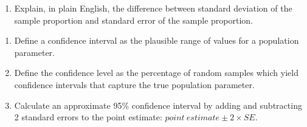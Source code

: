 \documentclass[11pt]{article}
\begin{document}
{{\begin{itemize}
{\begin{enumerate}
\item Explain, in plain English, the difference between standard deviation of the sample proportion and standard error of the sample proportion.
\end{enumerate}
}
\end{itemize}
}}


%

\vspace{0.5cm}

%

\begin{enumerate}[resume]
\renewcommand\labelenumi{\textcolor{light}{\textbf{LO \theenumi.}}}

\item Define a confidence interval as the plausible range of values for a population parameter.

\item Define the confidence level as the percentage of random samples which yield confidence intervals that capture the true population parameter.

\item Calculate an approximate 95\% confidence interval by adding and subtracting 2 standard errors to the point estimate: $point~estimate \pm 2 \times SE$.


\end{enumerate}
\end{document}
